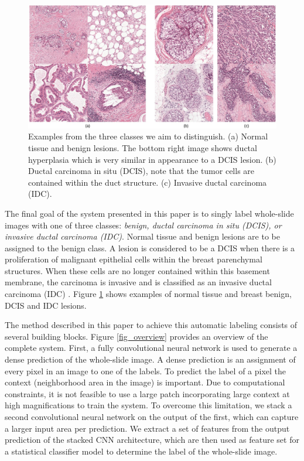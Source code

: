 \documentclass[journal]{IEEEtran}
\begin{document}
\bigskip

\begin{figure}[!t]
\centering
\hspace{0.1cm}\includegraphics[width=7in]{lesion_examples}%
\caption{Examples from the three classes we aim to distinguish. (a) Normal tissue and benign lesions. The bottom right image shows ductal hyperplasia which is very similar in appearance to a DCIS lesion. (b) Ductal carcinoma in situ (DCIS), note that the tumor cells are contained within the duct structure. (c) Invasive ductal carcinoma (IDC).}
\label{fig_lesion_examples}
\end{figure}



The final goal of the system presented in this paper is to singly label whole-slide images with one of three classes: \emph{benign, ductal carcinoma in situ (DCIS), or invasive ductal carcinoma (IDC)}. Normal tissue and benign lesions are to be assigned to the benign class. A lesion is considered to be a DCIS when there is a proliferation of malignant epithelial cells within the breast parenchymal structures. When these cells are no longer contained within this basement membrane, the carcinoma is invasive and is classified as an invasive ductal carcinoma (IDC) \cite{ellis2010intraductal}. Figure \ref{fig_lesion_examples} shows examples of normal tissue and breast benign, DCIS and IDC lesions.

The method described in this paper to achieve this automatic labeling consists of several building blocks. Figure \ref{fig_overview} provides an overview of the complete system. First, a fully convolutional neural network is used to generate a dense prediction of the whole-slide image. A dense prediction is an assignment of every pixel in an image to one of the labels. To predict the label of a pixel the context (neighborhood area in the image) is important. Due to computational constraints, it is not feasible to use a large patch incorporating large context at high magnifications to train the system. To overcome this limitation, we stack a second convolutional neural network on the output of the first, which can capture a larger input area per prediction. We extract a set of features from the output prediction of the stacked CNN architecture, which are then used as feature set for a statistical classifier model to determine the label of the whole-slide image.
\end{document}
